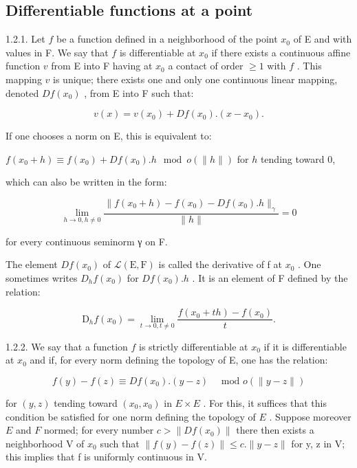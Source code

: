 \subsection{Differentiable functions at a point}

1.2.1. Let \(f\) be a function defined in a neighborhood of the point \(x_{0}\) of E and with values in F. We say that \(f\) is differentiable at \(x_{0}\) if there exists a continuous affine function \(v\) from E into F having at \(x_{0}\) a contact of order \(\geqslant 1\) with \(f\) . This mapping \(v\) is unique; there exists one and only one continuous linear mapping, denoted \(Df(x_{0})\) , from E into F such that:

\[
v (x) = v \left(x _ {0}\right) + D f \left(x _ {0}\right). \left(x - x _ {0}\right).
\]

If one chooses a norm on E, this is equivalent to:

\(f(x_0 + h) \equiv f(x_0) + Df(x_0).h \mod o(\|h\|)\) for \(h\) tending toward 0,

which can also be written in the form:

\[
\lim _ {h \rightarrow 0, h \neq 0} \frac {\| f (x _ {0} + h) - f (x _ {0}) - D f (x _ {0}) . h \| _ {\gamma}}{\| h \|} = 0
\]

for every continuous seminorm γ on F.

The element \(Df(x_{0})\) of \(\mathcal{L}(\mathrm{E},\mathrm{F})\) is called the derivative of f at \(x_{0}\) . One sometimes writes \(D_{h}f(x_{0})\) for \(Df(x_{0}).h\) . It is an element of F defined by the relation:

\[
\mathrm{D} _ {h} f (x _ {0}) = \lim _ {t \rightarrow 0, t \neq 0} \frac {f (x _ {0} + t h) - f (x _ {0})}{t}.
\]

1.2.2. We say that a function \(f\) is strictly differentiable at \(x_{0}\) if it is differentiable at \(x_{0}\) and if, for every norm defining the topology of E, one has the relation:

\[
f (y) - f (z) \equiv D f (x _ {0}). (y - z) \quad \text {   mod   } o (\| y - z \|)
\]

for \((y, z)\) tending toward \((x_0, x_0)\) in \(E \times E\) . For this, it suffices that this condition be satisfied for one norm defining the topology of \(E\) . Suppose moreover \(E\) and \(F\) normed; for every number \(c > \|Df(x_0)\|\) there then exists a neighborhood V of \(x_{0}\) such that \(\|f(y)-f(z)\|\leqslant c.\|y-z\|\) for y, z in V; this implies that f is uniformly continuous in V.

